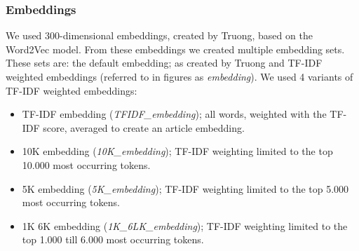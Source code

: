 \documentclass[runningheads]{llncs}
\begin{document}
\subsubsection{Embeddings}
We used 300-dimensional embeddings, created by Truong\cite{Truong2017Thesis}, based on the Word2Vec model. From these embeddings we created multiple embedding sets. These sets are: the default embedding; as created by Truong\cite{Truong2017Thesis} and TF-IDF weighted embeddings (referred to in figures as \textit{embedding}). We used 4 variants of TF-IDF weighted embeddings: 
\begin{itemize}
\item{TF-IDF embedding (\textit{TFIDF\_embedding}); all words, weighted with the TF-IDF score, averaged to create an article embedding.}
\item{10K embedding (\textit{10K\_embedding}); TF-IDF weighting limited to the top 10.000 most occurring tokens.}
\item{5K embedding (\textit{5K\_embedding}); TF-IDF weighting limited to the top 5.000 most occurring tokens.}
\item{1K 6K embedding (\textit{1K\_6LK\_embedding}); TF-IDF weighting limited to the top 1.000 till 6.000 most occurring tokens.}
\end{itemize}
\end{document}
